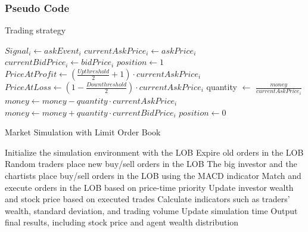 \documentclass[a4paper, 12pt]{article}
\begin{document}
        \subsubsection{Pseudo Code}
        \begin{algorithm}[H]
        \caption{Trading strategy}
        \label{alg:market_simulation}
        \begin{algorithmic}[1]
        

        \State $Signal_i \gets askEvent_i$
        \State $currentAskPrice_i \gets askPrice_i$
        \State $currentBidPrice_i \gets bidPrice_i$
        \State $position \gets 1$
        \State $PriceAtProfit \gets \left(\frac{Upthreshold}2+1\right)\cdot{currentAskPrice_i}$
        \State $PriceAtLoss \gets \left(1-\frac{Downthreshold}2\right)\cdot{currentAskPrice_i}$
        \State quantity $\gets$ $\frac{money}{currentAskPrice_i}$
        \State $money \gets money-quantity\cdot{currentAskPrice_i}$
        \EndIf
             \State $money \gets money+quantity\cdot{currentBidPrice_i}$
             \State $position \gets 0$
             \EndIf
       
        \EndIf
        
        \end{algorithmic}
        \end{algorithm}

        \begin{algorithm}
        \caption{Market Simulation with Limit Order Book}
        \label{alg:market_simulation}
        \begin{algorithmic}[1]
        \State Initialize the simulation environment with the LOB
        \State Expire old orders in the LOB
        \State Random traders place new buy/sell orders in the LOB
        \State The big investor and the chartists place buy/sell orders in the LOB using the MACD indicator
        \State Match and execute orders in the LOB based on price-time priority
        \State Update investor wealth and stock price based on executed trades
        \State Calculate indicators such as traders' wealth, standard deviation, and trading volume
        \State Update simulation time
        \EndWhile
        \State Output final results, including stock price and agent wealth distribution
        \end{algorithmic}
        \end{algorithm}
\end{document}
